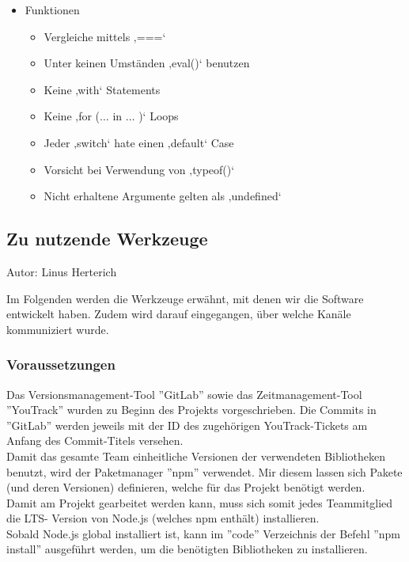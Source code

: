 \documentclass[twoside]{report}
\begin{document}
\begin{itemize}
	\item Funktionen\par

\begin{itemize}
	\item Vergleiche mittels ‚===‘

	\item Unter keinen Umständen ‚eval()‘ benutzen\par

	\item Keine ‚with‘ Statements\par

	\item Keine ‚for ($ \ldots $  in $ \ldots $ )‘ Loops\par

	\item Jeder ‚switch‘ hate einen ‚default‘ Case\par

	\item Vorsicht bei Verwendung von ‚typeof()‘\par

	\item Nicht erhaltene Argumente gelten als ‚undefined‘
\end{itemize}\par
\end{itemize}


\subsection{Zu nutzende Werkzeuge}
{\small Autor: Linus Herterich}

Im Folgenden werden die Werkzeuge erwähnt, mit denen wir die Software
entwickelt haben. Zudem wird darauf eingegangen, über welche Kanäle kommuniziert
wurde.


\subsubsection{Voraussetzungen}
Das Versionsmanagement-Tool ''GitLab'' sowie das Zeitmanagement-Tool ''YouTrack''
wurden zu Beginn des Projekts vorgeschrieben. Die Commits in ''GitLab'' werden jeweils mit
der ID des zugehörigen YouTrack-Tickets am Anfang des Commit-Titels versehen.
\\Damit das gesamte Team einheitliche Versionen der verwendeten Bibliotheken benutzt,
wird der Paketmanager ''npm'' verwendet. Mir diesem lassen sich Pakete (und deren Versionen) definieren,
welche für das Projekt benötigt werden.
\\ Damit am Projekt gearbeitet werden kann, muss sich somit jedes Teammitglied die LTS-
Version von Node.js (welches npm enthält) installieren.
\\ Sobald Node.js global installiert ist, kann im ''code'' Verzeichnis der Befehl
''npm install'' ausgeführt werden, um die benötigten Bibliotheken zu installieren.
\end{document}
